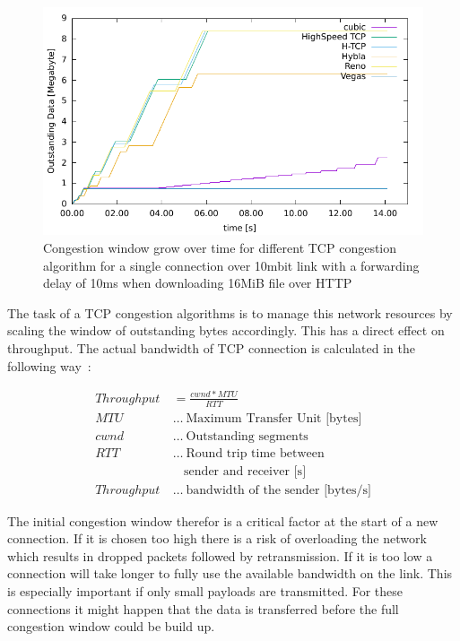 \begin{figure}[ht]
\footnotesize
\begin{center}
\includegraphics[scale=1]{figure/b2a_owin.pdf}
\caption{Congestion window grow over time for different TCP congestion
algorithm for a single connection over 10mbit link with a forwarding delay of
10ms when downloading 16MiB file over HTTP}
\label{fig:cwnd_tcp_algos}
\end{center}
\end{figure}

The task of a TCP congestion algorithms is to manage this network resources by
scaling the window of outstanding bytes accordingly. This has a direct effect on
throughput. The actual bandwidth of TCP connection is calculated in the
following way~\cite{opac-b1120676}:

\begin{align}
  Throughput &= \frac{cwnd * MTU}{RTT} \\
  MTU~&\dots~\text{Maximum Transfer Unit [bytes]} \nonumber\\
  cwnd~&\dots~\text{Outstanding segments} \nonumber\\
  RTT~&\dots~\text{Round trip time between} \nonumber\\
      &~~~~\text{sender and receiver [s]} \nonumber\\
  Throughput~&\dots~\text{bandwidth of the sender [bytes/s]} \nonumber
\end{align}

The initial congestion window therefor is a critical factor at the start of a
new connection. If it is chosen too high there is a risk of overloading the
network which results in dropped packets followed by retransmission. If it is
too low a connection will take longer to fully use the available bandwidth on the
link. This is especially important if only small payloads are transmitted. For
these connections it might happen that the data is transferred before the full
congestion window could be build up.

